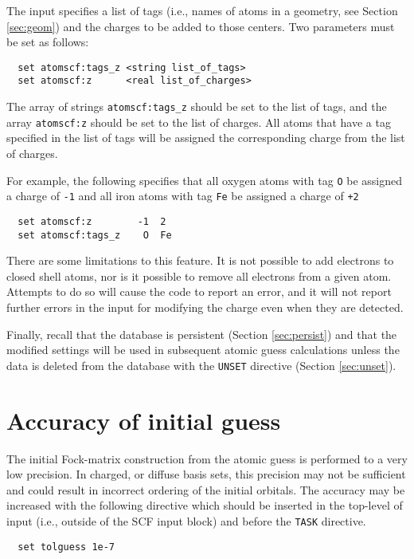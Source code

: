 The input specifies a list of tags (i.e., names of atoms in a
geometry, see Section \ref{sec:geom}) and the charges to be added to
those centers.  Two parameters must be set as follows:
\begin{verbatim}
  set atomscf:tags_z <string list_of_tags>
  set atomscf:z      <real list_of_charges>
\end{verbatim}

\sloppy

The array of strings \verb+atomscf:tags_z+ should be set to the list
of tags, and the array \verb+atomscf:z+ should be set to the list of
charges.  All atoms that have a tag specified in the list of tags will
be assigned the corresponding charge from the list of charges.

\fussy

For example, the following specifies that all oxygen atoms with tag
\verb+O+ be assigned a charge of \verb+-1+ and all iron atoms with tag
\verb+Fe+ be assigned a charge of \verb=+2=
\begin{verbatim}
  set atomscf:z        -1  2
  set atomscf:tags_z    O  Fe
\end{verbatim}

There are some limitations to this feature.  It is not possible to add
electrons to closed shell atoms, nor is it possible to remove all
electrons from a given atom.  Attempts to do so will cause the code to
report an error, and it will not report further errors in the input
for modifying the charge even when they are detected.

Finally, recall that the database is persistent (Section
\ref{sec:persist}) and that the modified settings will be used in
subsequent atomic guess calculations unless the data is deleted from
the database with the \verb+UNSET+ directive (Section
\ref{sec:unset}).

\section{Accuracy of initial guess}
\label{sec:tolguess}

The initial Fock-matrix construction from the atomic guess is
performed to a very low precision.  In charged, or diffuse basis sets,
this precision may not be sufficient and could result in incorrect
ordering of the initial orbitals.  The accuracy may be increased with
the following directive which should be inserted in the top-level of
input (i.e., outside of the SCF input block) and before the {\tt TASK}
directive.  
\begin{verbatim}
  set tolguess 1e-7
\end{verbatim}


